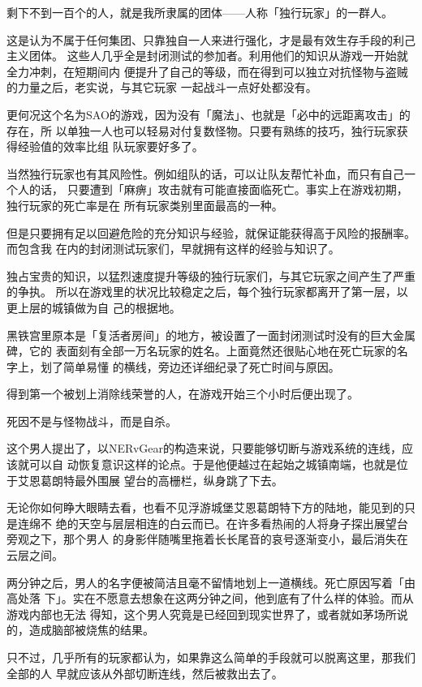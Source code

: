 \documentclass[11pt]{book}
\begin{document}
剩下不到一百个的人，就是我所隶属的团体——人称「独行玩家」的一群人。

这是认为不属于任何集团、只靠独自一人来进行强化，才是最有效生存手段的利己主义团体。
这些人几乎全是封闭测试的参加者。利用他们的知识从游戏一开始就全力冲刺，在短期间内
便提升了自己的等级，而在得到可以独立对抗怪物与盗贼的力量之后，老实说，与其它玩家
一起战斗一点好处都没有。

更何况这个名为SAO的游戏，因为没有「魔法」、也就是「必中的远距离攻击」的存在，所
以单独一人也可以轻易对付复数怪物。只要有熟练的技巧，独行玩家获得经验值的效率比组
队玩家要好多了。

当然独行玩家也有其风险性。例如组队的话，可以让队友帮忙补血，而只有自己一个人的话，
只要遭到「麻痹」攻击就有可能直接面临死亡。事实上在游戏初期，独行玩家的死亡率是在
所有玩家类别里面最高的一种。

但是只要拥有足以回避危险的充分知识与经验，就保证能获得高于风险的报酬率。而包含我
在内的封闭测试玩家们，早就拥有这样的经验与知识了。

独占宝贵的知识，以猛烈速度提升等级的独行玩家们，与其它玩家之间产生了严重的争执。
所以在游戏里的状况比较稳定之后，每个独行玩家都离开了第一层，以更上层的城镇做为自
己的根据地。

黑铁宫里原本是「复活者房间」的地方，被设置了一面封闭测试时没有的巨大金属碑，它的
表面刻有全部一万名玩家的姓名。上面竟然还很贴心地在死亡玩家的名字上，划了简单易懂
的横线，旁边还详细纪录了死亡时间与原因。

得到第一个被划上消除线荣誉的人，在游戏开始三个小时后便出现了。

死因不是与怪物战斗，而是自杀。

这个男人提出了，以NERvGear的构造来说，只要能够切断与游戏系统的连线，应该就可以自
动恢复意识这样的论点。于是他便越过在起始之城镇南端，也就是位于艾恩葛朗特最外围展
望台的高栅栏，纵身跳了下去。

无论你如何睁大眼睛去看，也看不见浮游城堡艾恩葛朗特下方的陆地，能见到的只是连绵不
绝的天空与层层相连的白云而已。在许多看热闹的人将身子探出展望台旁观之下，那个男人
的身影伴随嘴里拖着长长尾音的哀号逐渐变小，最后消失在云层之间。

两分钟之后，男人的名字便被简洁且毫不留情地划上一道横线。死亡原因写着「由高处落
下」。实在不愿意去想象在这两分钟之间，他到底有了什么样的体验。而从游戏内部也无法
得知，这个男人究竟是已经回到现实世界了，或者就如茅场所说的，造成脑部被烧焦的结果。

只不过，几乎所有的玩家都认为，如果靠这么简单的手段就可以脱离这里，那我们全部的人
早就应该从外部切断连线，然后被救出去了。
\end{document}
